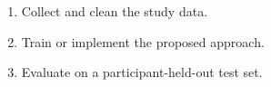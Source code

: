 \begin{enumerate}
  \item Collect and clean the study data.
  \item Train or implement the proposed approach.
  \item Evaluate on a participant-held-out test set.
\end{enumerate}


